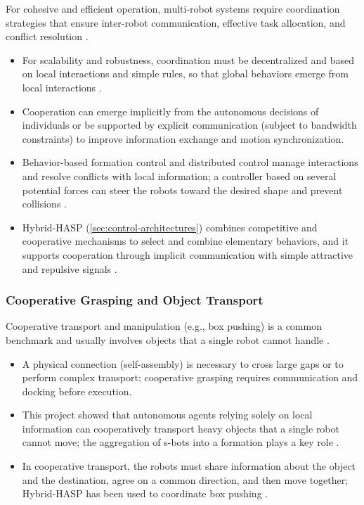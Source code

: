 For cohesive and efficient operation, multi-robot systems require coordination
strategies that ensure inter-robot communication, effective task allocation, and
conflict resolution \cite{yan2013survey}.
\begin{itemize}
  \item {} For scalability and robustness,
        coordination must be decentralized and based on local interactions and
        simple rules, so that global behaviors emerge from local interactions
        \cite{brambilla2013swarm}.
  \item {} Cooperation can emerge implicitly from the
        autonomous decisions of individuals or be supported by explicit
        communication (subject to bandwidth constraints) to improve information
        exchange and motion synchronization.
  \item {} Behavior-based formation control and
        distributed control manage interactions and resolve conflicts with local
        information; a controller based on several potential forces can steer
        the robots toward the desired shape and prevent collisions
        \cite{tan2016handbook}.
  \item {} Hybrid-HASP
        (\cref{sec:control-architectures}) combines competitive and cooperative
        mechanisms to select and combine elementary behaviors, and it supports
        cooperation through implicit communication with simple attractive and
        repulsive signals \cite{tan2016handbook}.
\end{itemize}

\subsubsection{Cooperative Grasping and Object Transport}

Cooperative transport and manipulation (e.g., box pushing) is a common benchmark
and usually involves objects that a single robot cannot handle
\cite{bonabeau1999swarm,brambilla2013swarm}.
\begin{itemize}
  \item {} A physical connection (self-assembly) is
        necessary to cross large gaps or to perform complex transport;
        cooperative grasping requires communication and docking before
        execution.
  \item {} This project showed that autonomous agents
        relying solely on local information can cooperatively transport heavy
        objects that a single robot cannot move; the aggregation of s-bots into a
        formation plays a key role \cite{mondada2003swarmbot,gross2006object}.
  \item {} In cooperative transport, the robots must share
        information about the object and the destination, agree on a common
        direction, and then move together; Hybrid-HASP has been used to
        coordinate box pushing \cite{tan2016handbook}.
\end{itemize}


